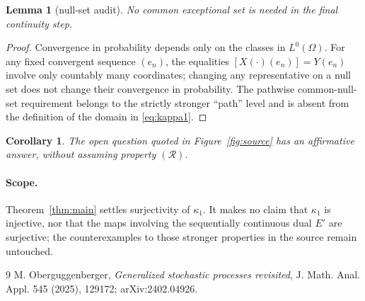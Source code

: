 \documentclass[11pt]{article}
\newtheorem{lemma}[theorem]{Lemma}
\newtheorem{corollary}[theorem]{Corollary}
\newcommand{\Om}{\Omega}
\newcommand{\Lzero}{L^0}
\begin{document}
\begin{lemma}[null-set audit]\label{lem:null}
No common exceptional set is needed in the final continuity step.
\end{lemma}

\begin{proof}
Convergence in probability depends only on the classes in $\Lzero(\Om)$.
For any fixed convergent sequence $(e_n)$, the equalities
$[X(\mathord\cdot)(e_n)]=Y(e_n)$ involve only countably many coordinates;
changing any representative on a null set does not change their convergence
in probability.  The pathwise common-null-set requirement belongs to the
strictly stronger ``path'' level and is absent from the definition of the
domain in \eqref{eq:kappa1}.
\end{proof}

\begin{corollary}
The open question quoted in Figure~\ref{fig:source} has an affirmative
answer, without assuming property $(\mathcal R)$.
\end{corollary}

\paragraph{Scope.}
Theorem~\ref{thm:main} settles surjectivity of $\kappa_1$.  It makes no claim
that $\kappa_1$ is injective, nor that the maps involving the sequentially
continuous dual $E'$ are surjective; the counterexamples to those stronger
properties in the source remain untouched.

{\small
\begin{thebibliography}{9}
M. Oberguggenberger,
\emph{Generalized stochastic processes revisited},
J. Math. Anal. Appl. 545 (2025), 129172; arXiv:2402.04926.
\end{thebibliography}
}
\end{document}
